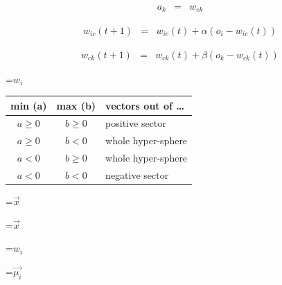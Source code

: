{\newpage
\clearpage
\samepage \begin{eqnarray*}a_{k} & = & w_{ck}  
\end{eqnarray*}
}

{\newpage
\clearpage
\samepage \begin{eqnarray*}%
w_{ic}(t+1) & = &  w_{ic}(t) + \alpha(o_{i} - w_{ic}(t))
\end{eqnarray*}
}

{\newpage
\clearpage
\samepage \begin{eqnarray*}w_{ck}(t+1) & = &  w_{ck}(t) + \beta(o_{k} - w_{ck}(t))
\end{eqnarray*}
}

{\newpage
\clearpage
\samepage \setbox\sizebox=\hbox{$w_i$}\box\sizebox
}

{\newpage
\clearpage
\samepage \begin{table}[htbp]
\begin{center}
\begin{tabular}{|c|c||l|}\hline
min (a)    & max (b)    & vectors out of \ldots \\ \hline
$a \geq 0$ & $b \geq 0$ & positive sector \\ 
$a \geq 0$ & $b < 0$    & whole hyper-sphere \\ 
$a < 0 $   & $b \geq 0$ & whole hyper-sphere \\ 
$a < 0 $   & $b < 0$    & negative sector \\ \hline
\end{tabular}
\end{center}
\label{ini0}
\end{table}
}

{\newpage
\clearpage
\samepage \setbox\sizebox=\hbox{$\vec{x}$}\box\sizebox
}

{\newpage
\clearpage
\samepage \setbox\sizebox=\hbox{$\vec{x}$}\box\sizebox
}

{\newpage
\clearpage
\samepage \setbox\sizebox=\hbox{$w_{i}$}\box\sizebox
}

{\newpage
\clearpage
\samepage \setbox\sizebox=\hbox{$\vec{\mu_{i}}$}\box\sizebox
}

